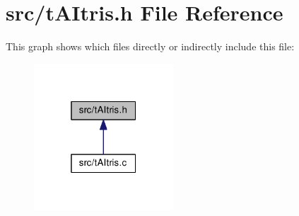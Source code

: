 \section{src/t\+A\+Itris.h File Reference}
\label{tAItris_8h}
This graph shows which files directly or indirectly include this file\+:
\nopagebreak
\begin{figure}[H]
\begin{center}
\leavevmode
\includegraphics[width=148pt]{tAItris_8h__dep__incl}
\end{center}
\end{figure}
